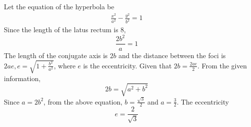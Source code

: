 Let the equation of the hyperbola be
%
\begin{align}
\frac{x^2}{a^2}- \frac{y^2}{b^2} = 1
\end{align}
%
Since the length of the latus rectum is 8,
%
\begin{equation}
\frac{2b^2}{a} =1
\end{equation}
%
The length of the conjugate axis is $2b$ and the distance between the foci is $2ae, e = \sqrt{1 + \frac{b^2}{a^2}}$, where $e$ is the eccentricity. Given that $2b = \frac{2ae}{2}$.
From the given information,
%
\begin{equation}
2b = \sqrt{a^2 + b^2}
\end{equation}
%
Since $a = 2b^2$, from the above equation, $b = \frac{\sqrt{3}}{2}$ and $a = \frac{3}{2}$. The eccentricity
%
\begin{equation}
e = \frac{2}{\sqrt{3}}
\end{equation}
%
